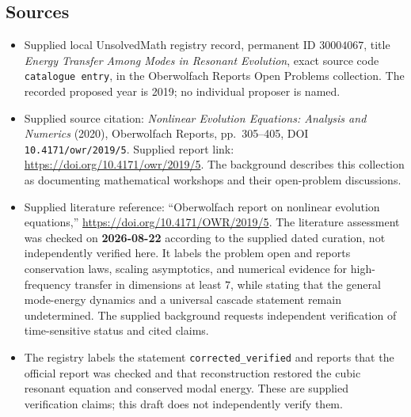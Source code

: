 \documentclass[11pt]{article}
\begin{document}
\subsection{Sources}
\begin{itemize}
\item Supplied local UnsolvedMath registry record, permanent ID \(30004067\), title \emph{Energy Transfer Among Modes in Resonant Evolution}, exact source code \texttt{catalogue entry}, in the Oberwolfach Reports Open Problems collection. The recorded proposed year is 2019; no individual proposer is named.
\item Supplied source citation: \emph{Nonlinear Evolution Equations: Analysis and Numerics} (2020), Oberwolfach Reports, pp.~305--405, DOI \texttt{10.4171/owr/2019/5}. Supplied report link: \url{https://doi.org/10.4171/owr/2019/5}. The background describes this collection as documenting mathematical workshops and their open-problem discussions.
\item Supplied literature reference: ``Oberwolfach report on nonlinear evolution equations,'' \url{https://doi.org/10.4171/OWR/2019/5}. The literature assessment was checked on \textbf{2026-08-22} according to the supplied dated curation, not independently verified here. It labels the problem open and reports conservation laws, scaling asymptotics, and numerical evidence for high-frequency transfer in dimensions at least \(7\), while stating that the general mode-energy dynamics and a universal cascade statement remain undetermined. The supplied background requests independent verification of time-sensitive status and cited claims.
\item The registry labels the statement \texttt{corrected\_verified} and reports that the official report was checked and that reconstruction restored the cubic resonant equation and conserved modal energy. These are supplied verification claims; this draft does not independently verify them.
\end{itemize}
\end{document}
